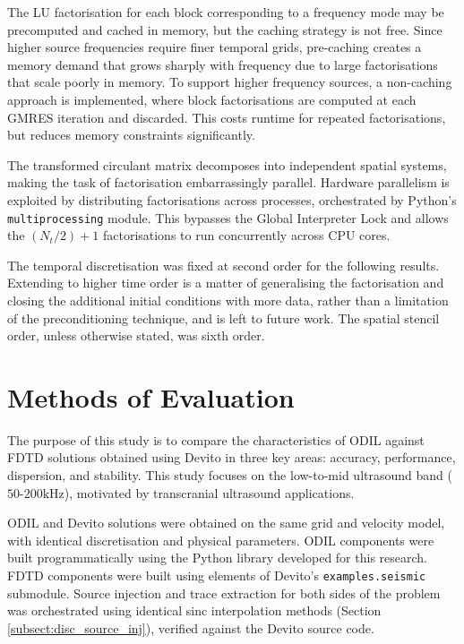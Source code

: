 \documentclass[final-report]{report-template}
\begin{document}
The LU factorisation for each block corresponding to a frequency mode may be precomputed and cached in memory, but the caching strategy is not free. Since higher source frequencies require finer temporal grids, pre-caching creates a memory demand that grows sharply with frequency due to large factorisations that scale poorly in memory. To support higher frequency sources, a non-caching approach is implemented, where block factorisations are computed at each GMRES iteration and discarded. This costs runtime for repeated factorisations, but reduces memory constraints significantly. 

The transformed circulant matrix decomposes into independent spatial systems, making the task of factorisation embarrassingly parallel. Hardware parallelism is exploited by distributing factorisations across processes, orchestrated by Python's \texttt{multiprocessing} module. This bypasses the Global Interpreter Lock and allows the $(N_t/2) + 1$ factorisations to run concurrently across CPU cores.

The temporal discretisation was fixed at second order for the following results. Extending to higher time order is a matter of generalising the factorisation and closing the additional initial conditions with more data, rather than a limitation of the preconditioning technique, and is left to future work. The spatial stencil order, unless otherwise stated, was sixth order.

\newpage
\section{Methods of Evaluation}
The purpose of this study is to compare the characteristics of ODIL against FDTD solutions obtained using Devito \cite{louboutinDevitoV310Embedded2019} in three key areas: accuracy, performance, dispersion, and stability. This study focuses on the low-to-mid ultrasound band ($50$-$200 \si{\kilo\hertz}$), motivated by transcranial ultrasound applications.

ODIL and Devito solutions were obtained on the same grid and velocity model, with identical discretisation and physical parameters. ODIL components were built programmatically using the Python library developed for this research. FDTD components were built using elements of Devito's \texttt{examples.seismic} submodule. Source injection and trace extraction for both sides of the problem was orchestrated using identical sinc interpolation methods (Section \ref{subsect:disc_source_inj}), verified against the Devito source code. 
\end{document}
